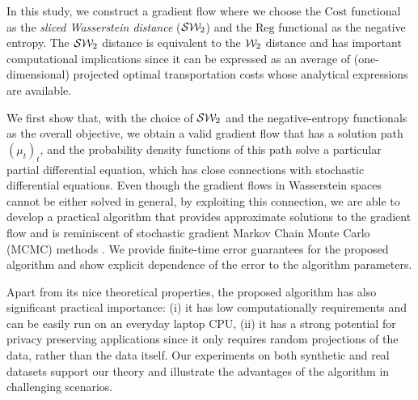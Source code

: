 In this study, we construct a gradient flow where we choose the $\mathrm{Cost}$ functional as the \textit{sliced Wasserstein distance} (${\cal S}{\cal W}_2$) and the $\mathrm{Reg}$ functional as the negative entropy. The ${\cal S}{\cal W}_2$ distance is equivalent to the ${\cal W}_2$ distance \cite{bonnotte2013unidimensional} and has important computational implications since it can be expressed as an average of (one-dimensional) projected optimal transportation costs whose analytical expressions are available. 

We first show that, with the choice of ${\cal S}{\cal W}_2$ and the negative-entropy functionals as the overall objective, we obtain a valid gradient flow that has a solution path $(\mu_t)_t$, and the probability density functions of this path solve a particular partial differential equation, which has close connections with stochastic differential equations. Even though the gradient flows in Wasserstein spaces cannot be either solved in general, by exploiting this connection, we are able to develop a practical algorithm that provides approximate solutions to the gradient flow and is reminiscent of stochastic gradient Markov Chain Monte Carlo (MCMC) methods \cite{WelTeh2011a,raginsky17a}. We provide finite-time error guarantees for the proposed algorithm and show explicit dependence of the error to the algorithm parameters. 

Apart from its nice theoretical properties, the proposed algorithm has also significant practical importance: (i) it has low computationally requirements and can be easily run on an everyday laptop CPU, (ii) it has a strong potential for privacy preserving applications since it only requires random projections of the data, rather than the data itself. Our experiments on both synthetic and real datasets support our theory and illustrate the advantages of the algorithm in challenging scenarios. 





